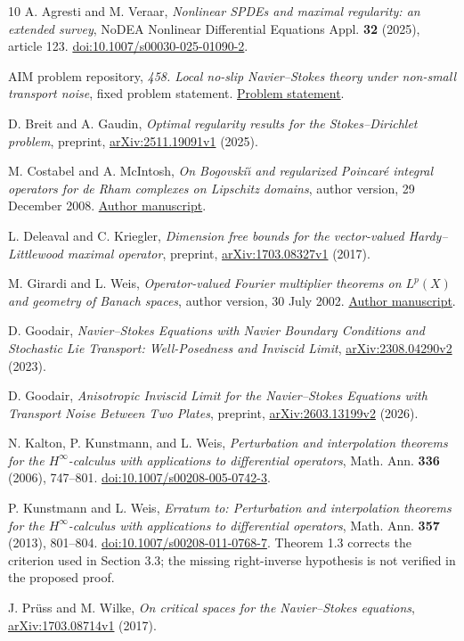 \documentclass[11pt]{article}
\numberwithin{equation}{section}
\theoremstyle{remark}
\begin{document}
\begin{thebibliography}{10}
A. Agresti and M. Veraar,
\emph{Nonlinear SPDEs and maximal regularity: an extended survey},
NoDEA Nonlinear Differential Equations Appl. \textbf{32} (2025), article 123.
\href{https://doi.org/10.1007/s00030-025-01090-2}{doi:10.1007/s00030-025-01090-2}.

AIM problem repository,
\emph{458. Local no-slip Navier--Stokes theory under non-small transport noise},
fixed problem statement.
\href{https://github.com/MColbrook/AIM/blob/a153f469ee0ea64e876b2ad97c79d252c19a3e22/problems/458-stochastic-navier-stokes-no-slip-local.md}{Problem statement}.

D. Breit and A. Gaudin,
\emph{Optimal regularity results for the Stokes--Dirichlet problem},
preprint, \href{https://arxiv.org/abs/2511.19091v1}{arXiv:2511.19091v1} (2025).

M. Costabel and A. McIntosh,
\emph{On Bogovski\u\i{} and regularized Poincar\'e integral operators for de Rham
complexes on Lipschitz domains}, author version, 29 December 2008.
\href{https://costabel.perso.math.cnrs.fr/publis/PoiBogdeRhv2.pdf}{Author manuscript}.

L. Deleaval and C. Kriegler,
\emph{Dimension free bounds for the vector-valued Hardy--Littlewood maximal operator},
preprint, \href{https://arxiv.org/abs/1703.08327v1}{arXiv:1703.08327v1} (2017).

M. Girardi and L. Weis,
\emph{Operator-valued Fourier multiplier theorems on $L^p(X)$ and geometry
of Banach spaces}, author version, 30 July 2002.
\href{https://people.math.sc.edu/girardi/papers/22.pdf}{Author manuscript}.

D. Goodair,
\emph{Navier--Stokes Equations with Navier Boundary Conditions and Stochastic
Lie Transport: Well-Posedness and Inviscid Limit},
\href{https://arxiv.org/abs/2308.04290v2}{arXiv:2308.04290v2} (2023).

D. Goodair,
\emph{Anisotropic Inviscid Limit for the Navier--Stokes Equations with
Transport Noise Between Two Plates},
preprint, \href{https://arxiv.org/abs/2603.13199v2}{arXiv:2603.13199v2} (2026).

N. Kalton, P. Kunstmann, and L. Weis,
\emph{Perturbation and interpolation theorems for the $H^\infty$-calculus
with applications to differential operators},
Math. Ann. \textbf{336} (2006), 747--801.
\href{https://doi.org/10.1007/s00208-005-0742-3}{doi:10.1007/s00208-005-0742-3}.

P. Kunstmann and L. Weis,
\emph{Erratum to: Perturbation and interpolation theorems for the
$H^\infty$-calculus with applications to differential operators},
Math. Ann. \textbf{357} (2013), 801--804.
\href{https://doi.org/10.1007/s00208-011-0768-7}{doi:10.1007/s00208-011-0768-7}.
Theorem 1.3 corrects the criterion used in Section 3.3; the missing
right-inverse hypothesis is not verified in the proposed proof.

J. Pr\"uss and M. Wilke,
\emph{On critical spaces for the Navier--Stokes equations},
\href{https://arxiv.org/abs/1703.08714v1}{arXiv:1703.08714v1} (2017).
\end{thebibliography}
\end{document}
